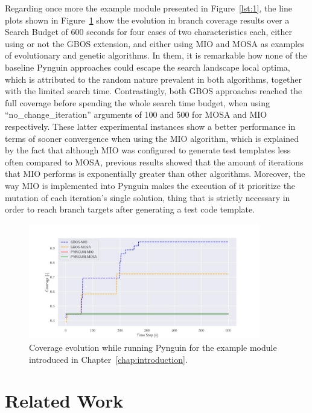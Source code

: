\documentclass[%
  chapterprefix=false,%
  open=right,%
  twoside=true,%
  paper=a4,%
  logofile={Figures/logo.png},%
  thesistype=master,%
  UKenglish,%
]{se2thesis}
\begin{document}
Regarding once more the example module presented in Figure~\ref{lst:1}, the line plots shown in Figure~\ref{fig:example_cov} show the evolution in branch coverage results over a Search Budget of 600 seconds for four cases of two characteristics each, either using or not the GBOS extension, and either using MIO and MOSA as examples of evolutionary and genetic algorithms.
In them, it is remarkable how none of the baseline Pynguin approaches could escape the search landscape local optima, which is attributed to the random nature prevalent in both algorithms, together with the limited search time.
Contrastingly, both GBOS approaches reached the full coverage before spending the whole search time budget, when using ``no\_change\_iteration'' arguments of 100 and 500 for MOSA and MIO respectively.
These latter experimental instances show a better performance in terms of sooner convergence when using the MIO algorithm, which is explained by the fact that although MIO was configured to generate test templates less often compared to MOSA, previous results showed that the amount of iterations that MIO performs is exponentially greater than other algorithms.
Moreover, the way MIO is implemented into Pynguin makes the execution of it prioritize the mutation of each iteration's single solution, thing that is strictly necessary in order to reach branch targets after generating a test code template. 

\begin{figure}[htb]
  \centering
  \includegraphics[width=0.9\textwidth]{Figures/Results/exampleCov.jpg}
  \caption{Coverage evolution while running Pynguin for the example module introduced in Chapter~\ref{chap:introduction}.}\label{fig:example_cov}
\end{figure}

\chapter{Related Work}\label{chap:related_work}
\end{document}

